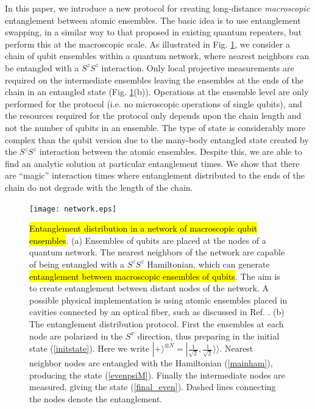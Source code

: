 \documentclass[%
  prx,%
  twocolumn,%
  preprintnumbers,%
  amsmath,%
  amssymb,%
  superscriptaddress%
]{revtex4}
\begin{document}
In this paper, we introduce a new protocol for creating long-distance {\it macroscopic} entanglement between atomic ensembles. The basic idea is to use entanglement swapping, in a similar way to that proposed in existing quantum repeaters, but perform this at the macroscopic scale. As illustrated in Fig. \ref{fig1}, we consider a chain of qubit ensembles within a quantum network, where nearest neighbors can be entangled with a $S^z S^z$ interaction.  Only local projective measurements are required on the intermediate ensembles leaving the ensembles at the ends of the chain in an entangled state (Fig. \ref{fig1}(b)).  Operations at the ensemble level are only performed for the protocol (i.e. no microscopic operations of single qubits), and the resources required for the protocol only depends upon the chain length and not the number of qubits in an ensemble.
The type of state is considerably more complex than the qubit version due to the many-body entangled state created by the $S^z S^z$ interaction between the atomic ensembles. Despite this, we are able to find an analytic solution at particular entanglement times.  We show that there are ``magic'' interaction times  where entanglement distributed to the ends of the chain do not degrade with the length of the chain.



\begin{figure}[t]
\centering
\texttt{[image: network.eps]}
\caption{\label{fig1}
\hl{Entanglement distribution in a network of macroscopic qubit ensembles}.  (a) Ensembles of qubits are placed at the nodes of a quantum network.  The nearest neighbors of the network are capable of being entangled with a $ S^z S^z $ Hamiltonian, which can generate \hl{entanglement between macroscopic ensembles of qubits}.  The aim is to create entanglement between distant nodes of the network.  A possible physical implementation is using atomic ensembles placed in cavities connected by an optical fiber, such as discussed in Ref. \cite{pyrkov2013entanglement}.
(b) The entanglement distribution protocol.  First the ensembles at each node are polarized in the $ S^x $ direction, thus preparing in the initial state (\ref{initstate}).  Here we write $ | + \rangle^{\otimes N } = | \frac{1}{\sqrt{2}}, \frac{1}{\sqrt{2}}
\rangle \rangle $. Nearest neighbor nodes are entangled with the Hamiltonian (\ref{mainham}), producing the state (\ref{evenpsiM}).  Finally the intermediate nodes are measured, giving the state (\ref{final_even}). Dashed lines connecting the nodes denote the entanglement.    }
\end{figure}
\end{document}
